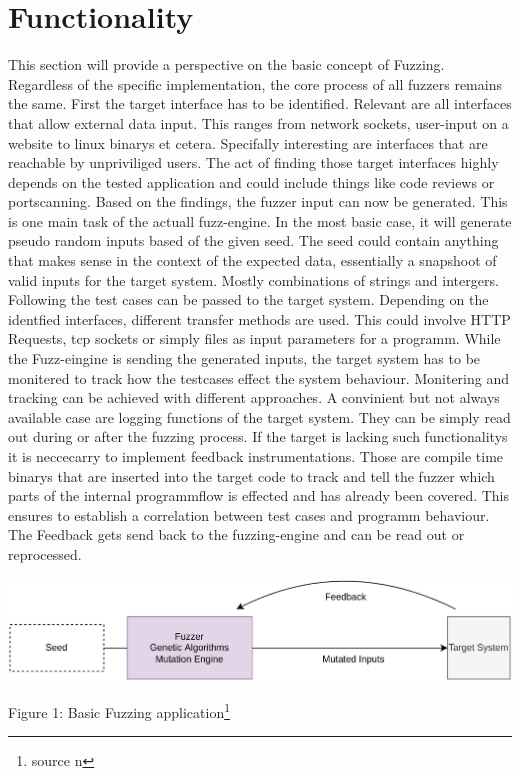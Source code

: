 \documentclass[journal=tosc,final]{iacrtrans}
\begin{document}
\section{Functionality}
This section will provide a perspective on the basic concept of Fuzzing. Regardless of the specific implementation, the core process of all fuzzers remains the same. First the target interface has to be identified. Relevant are all interfaces that allow external data input. This ranges from network sockets, user-input on a website to linux binarys et cetera. Specifally interesting are interfaces that are reachable by unpriviliged users. The act of finding those target interfaces highly depends on the tested application and could include things like code reviews or portscanning. Based on the findings, the fuzzer input can now be generated. This is one main task of the actuall fuzz-engine. In the most basic case, it will generate pseudo random inputs based of the given seed. The seed could contain anything that makes sense in the context of the expected data, essentially a snapshoot of valid inputs for the target system. Mostly combinations of strings and intergers. Following the test cases can be passed to the  target system. Depending on the identfied interfaces, different transfer methods are used. This could involve HTTP Requests, tcp sockets or simply files as input parameters for a programm. While the Fuzz-eingine is sending the generated inputs, the target system has to be monitered to track how the testcases effect the system behaviour. Monitering and tracking can be achieved with different approaches. A convinient but not always available case are logging functions of the target system. They can be simply read out during or after the fuzzing process. If the target is lacking such functionalitys it is neccecarry to implement feedback instrumentations. Those are compile time binarys that are inserted into the target code to track and tell the fuzzer which parts of the internal programmflow is effected and has already been covered. This ensures to establish a correlation between test cases and programm behaviour. The Feedback gets send back to the fuzzing-engine and can be read out or reprocessed.
\newpage
\begin{shaded}

\begin{center}
 \includegraphics[scale=0.2]{../final2.png}

\vspace{2mm} Figure 1: Basic Fuzzing application\footnote{source n}
 \end{center}
\end{shaded}
\end{document}
